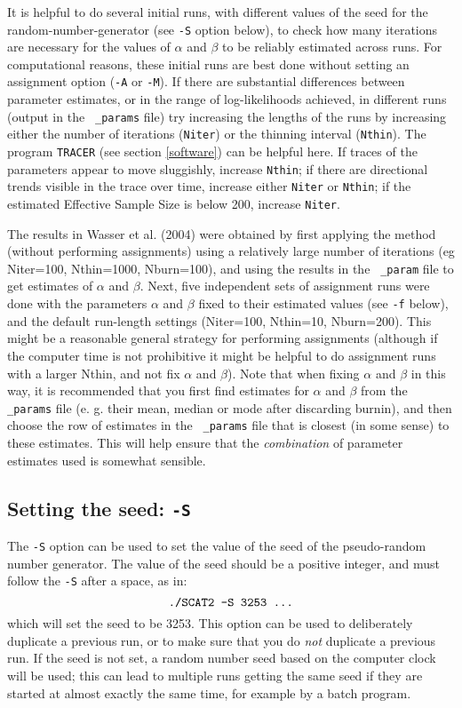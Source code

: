 \documentclass[10pt,titlepage,times,letterpaper]{article}
\begin{document}
It is helpful to do
several initial runs, with different values of the seed for the
random-number-generator (see {\tt -S} option below), to check how many
iterations are necessary for the values of $\alpha$ and $\beta$ to be
reliably estimated across runs. For computational reasons, these
initial runs are best done without setting an assignment option ({\tt -A}
or {\tt -M}).  If there are
substantial differences between parameter estimates, or in the range
of log-likelihoods achieved, in different runs (output in the {\tt
\_params} file) try increasing the lengths of the runs by increasing
either the number of iterations ({\tt Niter}) or the thinning interval
({\tt Nthin}).  The program {\tt TRACER} (see section \ref{software}) can be
helpful here.  If traces of the parameters appear to move sluggishly,
increase {\tt Nthin}; if there are directional trends visible in the
trace over time, increase either {\tt Niter} or {\tt Nthin}; if the
estimated Effective Sample Size is below 200, increase {\tt Niter}.

The results in Wasser et al. (2004) were obtained by 
first applying the method (without performing assignments)
using a relatively large number of iterations (eg
{Niter=100, Nthin=1000, Nburn=100}), and using the results in the {\tt
\_param} file to get estimates of $\alpha$ and $\beta$.  Next,
five independent sets of assignment runs were done with the parameters $\alpha$
and $\beta$ fixed to their estimated values (see {\tt -f} below), and
the default run-length settings (Niter=100, Nthin=10, Nburn=200). This
might be a reasonable general strategy for performing assignments
(although if the computer time is not prohibitive it might be helpful
to do assignment runs with a larger Nthin, and not fix $\alpha$ and
$\beta$). Note that when fixing $\alpha$ and $\beta$ in this way, it
is recommended that you first find estimates for $\alpha$ and $\beta$
from the {\tt \_params} file (e. g. their mean, median or mode after
discarding burnin), and then choose the row of estimates in the {\tt
\_params} file that is closest (in some sense) to these
estimates. This will help ensure that the {\it combination} of
parameter estimates used is somewhat sensible.


\subsection{Setting the seed: {\tt -S}} \label{Soption}

The {\tt -S} option can be used to set the value of the seed of the
pseudo-random number generator. The value of the seed should be a
positive integer, and must follow the {\tt -S} after a space, as in:
$$\text{{\tt ./SCAT2 -S 3253 ...}}$$
which will set the seed to be 3253. This option can be
used to deliberately duplicate a previous run, or to make sure 
that you do {\it not}
duplicate a previous run.  If the seed is not set, a 
random number seed based on the computer clock will be used;
this can lead to multiple runs getting the same seed if they are started
at almost exactly the same time, for example by a batch program.
\end{document}
